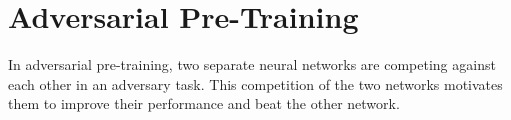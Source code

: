 
\section{Adversarial Pre-Training}\label{sec:nn_adv}
\thesisStateNotReady
In adversarial pre-training, two separate neural networks are competing against each other in an adversary task.
This competition of the two networks motivates them to improve their performance and beat the other network.






